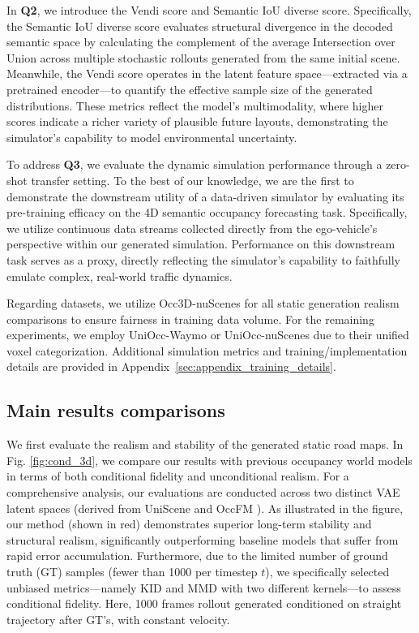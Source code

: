 In \textbf{Q2}, we introduce the Vendi score \cite{friedman2022vendi} and Semantic IoU diverse score. Specifically, the Semantic IoU diverse score evaluates structural divergence in the decoded semantic space by calculating the complement of the average Intersection over Union across multiple stochastic rollouts generated from the same initial scene. Meanwhile, the Vendi score operates in the latent feature space—extracted via a pretrained encoder—to quantify the effective sample size of the generated distributions. These metrics reflect the model's multimodality, where higher scores indicate a richer variety of plausible future layouts, demonstrating the simulator's capability to model environmental uncertainty.

To address \textbf{Q3}, we evaluate the dynamic simulation performance through a zero-shot transfer setting. To the best of our knowledge, we are the first to demonstrate the downstream utility of a data-driven simulator by evaluating its pre-training efficacy on the 4D semantic occupancy forecasting task. Specifically, we utilize continuous data streams collected directly from the ego-vehicle's perspective within our generated simulation. Performance on this downstream task serves as a  proxy, directly reflecting the simulator's capability to faithfully emulate complex, real-world traffic dynamics.

Regarding datasets, we utilize Occ3D-nuScenes \cite{tian2023occ3d} for all static generation realism comparisons to ensure fairness in training data volume. For the remaining experiments, we employ UniOcc-Waymo \cite{wang2025uniocc} or UniOcc-nuScenes due to their unified voxel categorization. Additional simulation metrics and training/implementation details are provided in Appendix~\ref{sec:appendix_training_details}.

\subsection{Main results comparisons}

We first evaluate the realism and stability of the generated static road maps. In Fig. \ref{fig:cond_3d}, we compare our results with previous occupancy world models in terms of both conditional fidelity and unconditional realism. For a comprehensive analysis, our evaluations are conducted across two distinct VAE latent spaces (derived from UniScene \cite{li2025uniscene} and OccFM \cite{liu2025towards}). As illustrated in the figure, our method (shown in red) demonstrates superior long-term stability and structural realism, significantly outperforming baseline models that suffer from rapid error accumulation. Furthermore, due to the limited number of ground truth (GT) samples (fewer than 1000 per timestep $t$), we specifically selected unbiased metrics—namely KID and MMD with two different kernels—to assess conditional fidelity. Here, 1000 frames rollout generated conditioned on straight trajectory after GT's, with constant velocity. 
 
